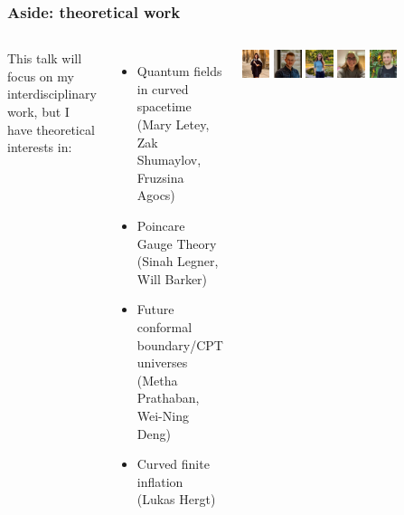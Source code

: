 \documentclass[aspectratio=169, handout]{beamer}
\begin{document}
\begin{frame}
    \frametitle{Aside: theoretical work}
    \begin{columns}

        This talk will focus on my interdisciplinary work, but I have theoretical interests in:
        \begin{itemize}
            \item Quantum fields in curved spacetime \\\hfill {\small (Mary Letey, Zak Shumaylov, Fruzsina Agocs)}
            \item Poincare Gauge Theory \\\hfill {\small (Sinah Legner, Will Barker)}
            \item Future conformal boundary/CPT universes \\\hfill {\small (Metha Prathaban, Wei-Ning Deng)}
            \item Curved finite inflation \hfill {\small (Lukas Hergt)}
        \end{itemize}
        \includegraphics[width=0.125\textwidth]{figures/students/mary_letey.jpg}%
        \includegraphics[width=0.125\textwidth]{figures/students/zak_shumaylov.jpg}%
        \includegraphics[width=0.125\textwidth]{figures/students/fruzsina_agocs.jpg}%
        \includegraphics[width=0.125\textwidth]{figures/students/sinah_legner.jpg}%
        \includegraphics[width=0.125\textwidth]{figures/students/will_barker.jpg}%

\end{columns}
\end{frame}
\end{document}
